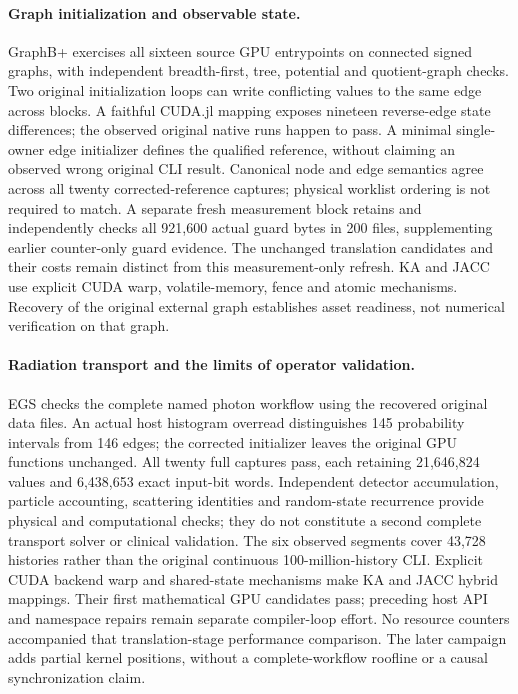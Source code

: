 \paragraph{Graph initialization and observable state.}
GraphB+ exercises all sixteen source GPU entrypoints on connected signed graphs, with independent breadth-first, tree, potential and quotient-graph checks. Two original initialization loops can write conflicting values to the same edge across blocks. A faithful CUDA.jl mapping exposes nineteen reverse-edge state differences; the observed original native runs happen to pass. A minimal single-owner edge initializer defines the qualified reference, without claiming an observed wrong original CLI result. Canonical node and edge semantics agree across all twenty corrected-reference captures; physical worklist ordering is not required to match. A separate fresh measurement block retains and independently checks all 921,600 actual guard bytes in 200 files, supplementing earlier counter-only guard evidence. The unchanged translation candidates and their costs remain distinct from this measurement-only refresh. KA and JACC use explicit CUDA warp, volatile-memory, fence and atomic mechanisms. Recovery of the original external graph establishes asset readiness, not numerical verification on that graph.

\paragraph{Radiation transport and the limits of operator validation.}
EGS checks the complete named photon workflow using the recovered original data files. An actual host histogram overread distinguishes 145 probability intervals from 146 edges; the corrected initializer leaves the original GPU functions unchanged. All twenty full captures pass, each retaining 21,646,824 values and 6,438,653 exact input-bit words. Independent detector accumulation, particle accounting, scattering identities and random-state recurrence provide physical and computational checks; they do not constitute a second complete transport solver or clinical validation. The six observed segments cover 43,728 histories rather than the original continuous 100-million-history CLI. Explicit CUDA backend warp and shared-state mechanisms make KA and JACC hybrid mappings. Their first mathematical GPU candidates pass; preceding host API and namespace repairs remain separate compiler-loop effort. No resource counters accompanied that translation-stage performance comparison. The later campaign adds partial kernel positions, without a complete-workflow roofline or a causal synchronization claim.

